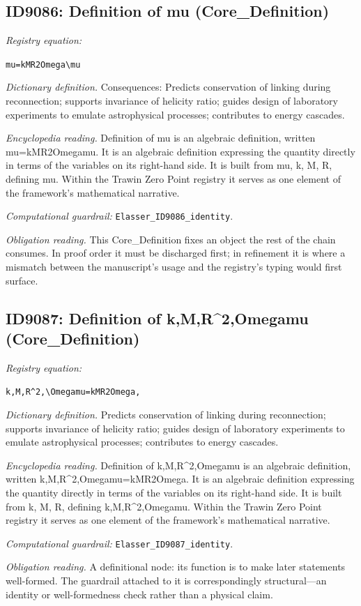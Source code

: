 \documentclass[11pt]{article}
\theoremstyle{remark}
\begin{document}
\subsection{ID9086: Definition of mu (Core\_Definition)}

\noindent\textit{Registry equation:}\par
{\small\texttt{mu=kMR2Omega\textbackslash{}mu}}\par\medskip
\noindent\textit{Dictionary definition.} Consequences: Predicts conservation of linking during reconnection; supports invariance of helicity ratio; guides design of laboratory experiments to emulate astrophysical processes; contributes to energy cascades.\par\medskip
\noindent\textit{Encyclopedia reading.} Definition of mu is an algebraic definition, written mu=kMR2Omegamu. It is an algebraic definition expressing the quantity directly in terms of the variables on its right-hand side. It is built from mu, k, M, R, defining mu. Within the Trawin Zero Point registry it serves as one element of the framework's mathematical narrative.
\par\medskip\noindent\textit{Computational guardrail:} \texttt{Elasser\_ID9086\_identity}.
\par\medskip\noindent\textit{Obligation reading.} This Core\_Definition fixes an object the rest of the chain consumes. In proof order it must be discharged first; in refinement it is where a mismatch between the manuscript's usage and the registry's typing would first surface.

\subsection{ID9087: Definition of k,M,R\textasciicircum{}2,Omegamu (Core\_Definition)}

\noindent\textit{Registry equation:}\par
{\small\texttt{k,M,R\textasciicircum{}2,\textbackslash{}Omegamu=kMR2Omega,}}\par\medskip
\noindent\textit{Dictionary definition.} Predicts conservation of linking during reconnection; supports invariance of helicity ratio; guides design of laboratory experiments to emulate astrophysical processes; contributes to energy cascades.\par\medskip
\noindent\textit{Encyclopedia reading.} Definition of k,M,R\textasciicircum{}2,Omegamu is an algebraic definition, written k,M,R\textasciicircum{}2,Omegamu=kMR2Omega. It is an algebraic definition expressing the quantity directly in terms of the variables on its right-hand side. It is built from k, M, R, defining k,M,R\textasciicircum{}2,Omegamu. Within the Trawin Zero Point registry it serves as one element of the framework's mathematical narrative.
\par\medskip\noindent\textit{Computational guardrail:} \texttt{Elasser\_ID9087\_identity}.
\par\medskip\noindent\textit{Obligation reading.} A definitional node: its function is to make later statements well-formed. The guardrail attached to it is correspondingly structural---an identity or well-formedness check rather than a physical claim.
\end{document}
